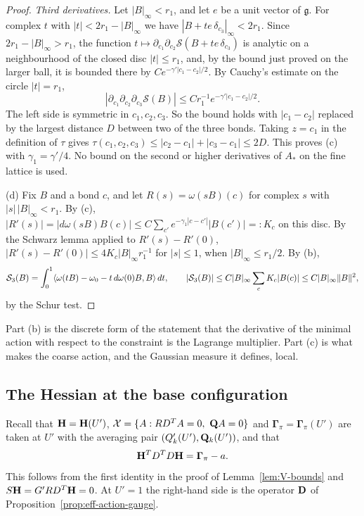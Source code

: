 \begin{proof}
\emph{Third derivatives.} Let $|B|_\infty<r_1$, and let $e$ be a unit vector of $\mathfrak g$. For complex $t$ with $|t|<2r_1-|B|_\infty$ we have $|B+te\,\delta_{c_3}|_\infty<2r_1$. Since $2r_1-|B|_\infty>r_1$, the function $t\mapsto\partial_{c_1}\partial_{c_2}\mathcal S(B+te\,\delta_{c_3})$ is analytic on a neighbourhood of the closed disc $|t|\le r_1$, and, by the bound just proved on the larger ball, it is bounded there by $Ce^{-\gamma'|c_1-c_2|/2}$. By Cauchy's estimate on the circle $|t|=r_1$,
\[
|\partial_{c_1}\partial_{c_2}\partial_{c_3}\mathcal S(B)|\le Cr_1^{-1}e^{-\gamma'|c_1-c_2|/2}.
\]
The left side is symmetric in $c_1,c_2,c_3$. So the bound holds with $|c_1-c_2|$ replaced by the largest distance $D$ between two of the three bonds. Taking $z=c_1$ in the definition of $\tau$ gives $\tau(c_1,c_2,c_3)\le|c_2-c_1|+|c_3-c_1|\le2D$. This proves (c) with $\gamma_1=\gamma'/4$. No bound on the second or higher derivatives of $A_*$ on the fine lattice is used.

(d) Fix $B$ and a bond $c$, and let $R(s)=\omega(sB)(c)$ for complex $s$ with $|s|\,|B|_\infty<r_1$. By (c), $|R'(s)|=|d\omega(sB)B(c)|\le C\sum_{c'}e^{-\gamma_1|c-c'|}|B(c')|=:K_c$ on this disc. By the Schwarz lemma applied to $R'(s)-R'(0)$, $|R'(s)-R'(0)|\le4K_c|B|_\infty r_1^{-1}$ for $|s|\le1$, when $|B|_\infty\le r_1/2$. By (b),
\[
\mathcal S_3(B)=\int_0^1\langle \omega(tB)-\omega_0-t\,d\omega(0)B,B\rangle\,dt,\qquad|\mathcal S_3(B)|\le C|B|_\infty\sum_c K_c|B(c)|\le C|B|_\infty\|B\|^2,
\]
by the Schur test.
\end{proof}

Part (b) is the discrete form of the statement that the derivative of the minimal action with respect to the constraint is the Lagrange multiplier. Part (c) is what makes the coarse action, and the Gaussian measure it defines, local.

\subsection{The Hessian at the base configuration}

Recall that $\mathbf H=\mathbf H(U')$, $\mathcal X=\{A:RD^TA=0,\ \mathbf Q A=0\}$ and $\boldsymbol\Gamma_\pi=\boldsymbol\Gamma_\pi(U')$ are taken at $U'$ with the averaging pair $(Q'_k(U'),\mathbf Q_k(U'))$, and that
\begin{equation}\label{eq:H-effective}
\mathbf H^TD^TD\mathbf H=\boldsymbol\Gamma_\pi-a .
\end{equation}
This follows from the first identity in the proof of Lemma~\ref{lem:V-bounds} and $S\mathbf H=G'RD^T\mathbf H=0$. At $U'=1$ the right-hand side is the operator $\mathbf D$ of Proposition~\ref{prop:eff-action-gauge}.

